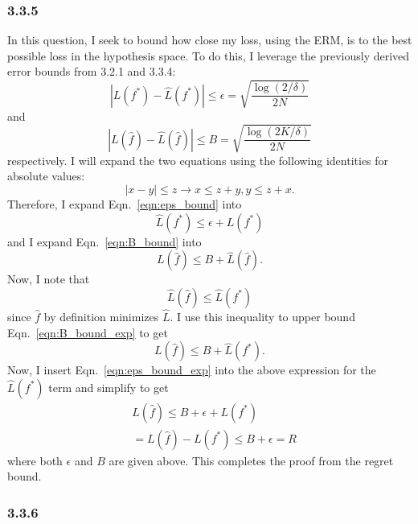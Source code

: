 \documentclass[12pt]{amsart}
\begin{document}
\subsubsection*{3.3.5}

In this question, I seek to bound how close my loss, using the ERM, is to the best possible loss in the hypothesis space.  To do this, I leverage the previously derived error bounds from 3.2.1 and 3.3.4:
\begin{equation} \label{eqn:eps_bound}
|L(f^*) - \hat{L}(f^*)| \leq \epsilon = \sqrt{\frac{\log(2/\delta)}{2N}}
\end{equation}
and
\begin{equation} \label{eqn:B_bound}
|L(\hat{f}) - \hat{L}(\hat{f})| \leq B = \sqrt{\frac{\log(2K/\delta)}{2N}}
\end{equation}
respectively.  I will expand the two equations using the following identities for absolute values:
\begin{equation*}
|x - y| \leq z \rightarrow x \leq z + y, y \leq z + x.
\end{equation*}
Therefore, I expand Eqn.~\ref{eqn:eps_bound} into 
\begin{equation} \label{eqn:eps_bound_exp}
\hat{L}(f^*) \leq \epsilon + L(f^*)
\end{equation}
and I expand Eqn.~\ref{eqn:B_bound} into
\begin{equation} \label{eqn:B_bound_exp}
L(\hat{f}) \leq B + \hat{L}(\hat{f}).
\end{equation}
Now, I note that
\begin{equation*}
\hat{L}(\hat{f}) \leq \hat{L}(f^*)
\end{equation*}
since $\hat{f}$ by definition minimizes $\hat{L}$.  I use this inequality to upper bound Eqn.~\ref{eqn:B_bound_exp} to get
\begin{equation}
L(\hat{f}) \leq B + \hat{L}(f^*).
\end{equation}
Now, I insert Eqn.~\ref{eqn:eps_bound_exp} into the above expression for the $\hat{L}(f^*)$ term and simplify to get
\begin{equation}
\begin{split}
& L(\hat{f}) \leq B + \epsilon + L(f^*) \\
& = L(\hat{f}) - L(f^*) \leq B + \epsilon = R
\end{split}
\end{equation}
where both $\epsilon$ and $B$ are given above.  This completes the proof from the regret bound.

\subsubsection*{3.3.6}
\end{document}
